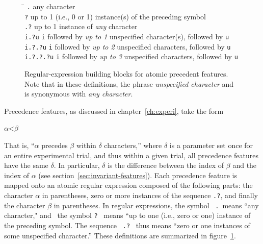 {\begin{figure}[t]
\begin{mdframed}
\begin{tabbing}
 \hspace{1in}  \=  \hspace{5.5in} \kill
\texttt{.} \> any character\\
\texttt{?} \> up to 1 (i.e., 0 or 1) instance(s) of the preceding symbol \\
\texttt{.?} \> up to 1 instance of \emph{any} character\\
\texttt{i.?u}  \>\texttt{i} followed by \emph{up to 1} unspecified character(s), followed by \texttt{u}\\
\texttt{i.?.?u}  \>\texttt{i} followed by \emph{up to 2} unspecified characters, followed by \texttt{u}\\
\texttt{i.?.?.?u}  \>\texttt{i} followed by \emph{up to 3} unspecified characters, followed by \texttt{u}\\
\end{tabbing}
\caption{Regular-expression building blocks for atomic precedent features. Note that in these definitions, the phrase \emph{unspecified character} %
and is synonymous with \emph{any character}. }
\label{fig:regex-defs}
\end{mdframed}
\end{figure}

Precedence features, as discussed in chapter~\ref{ch:experi}, take the form
\begin{center}
$\alpha\text{<}\beta$
\end{center}
That is, ``$\alpha$ precedes $\beta$ within $\delta$ characters,'' where $\delta$ is 
a parameter set once for an entire experimental trial, and thus within a given trial, all precedence features
have the same $\delta$.  In particular, $\delta$ is the difference between the 
index of $\beta$ and the index of $\alpha$ (see section~\ref{sec:invariant-features}).
Each precedence feature is mapped onto an atomic regular expression composed of the following parts:
the character $\alpha$ in parentheses, zero or more instances of the sequence \texttt{.?},  and finally
the character $\beta$ in parentheses. In regular expressions, the symbol \, \texttt{.} \,means ``any character," and 
\, the symbol \texttt{?} \, means ``up to one (i.e., zero or one) instance of the preceding symbol. The sequence \, \texttt{.?} \, 
thus means ``zero or one instances of some unspecified character.'' These definitions are summarized in figure~\ref{fig:regex-defs}.

}
